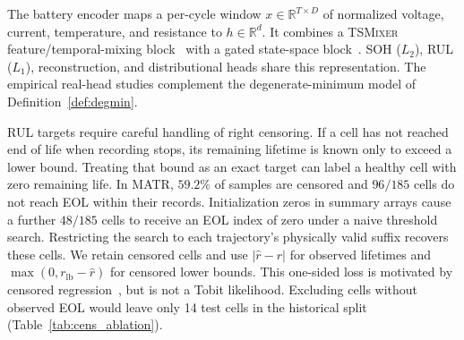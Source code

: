 \documentclass{article}
\begin{document}
\begin{table}[t]
\centering
\caption{Controlled high-dose collapse and task-recovery rates for three domains. Recovery is the fraction of seeds whose primary metric improves over the mean joint-training metric. HAR can retain high accuracy despite substantial shrinkage, so scatter recovery does not imply better accuracy. Battery uses 20 seeds per mode and RadioML ten; the historical HAR file provides aggregate rates. The joint recovery rate is set to zero by convention. All plotted rates are reproduced directly from the released records.}
\label{tab:unified_repair}
\footnotesize
{}
\end{table}

\clearpage
The battery encoder maps a per-cycle window $x\in\mathbb R^{T\times D}$ of normalized voltage, current, temperature, and resistance to $h\in\mathbb R^d$. It combines a \textsc{TSMixer} feature/temporal-mixing block~\citep{ekambaram2023tsmixer} with a gated state-space block~\citep{gu2022s4,gu2023mamba}. SOH ($L_2$), RUL ($L_1$), reconstruction, and distributional heads share this representation. The empirical real-head studies complement the degenerate-minimum model of Definition~\ref{def:degmin}.

RUL targets require careful handling of right censoring. If a cell has not reached end of life when recording stops, its remaining lifetime is known only to exceed a lower bound. Treating that bound as an exact target can label a healthy cell with zero remaining life. In MATR, $59.2\%$ of samples are censored and $96/185$ cells do not reach EOL within their records. Initialization zeros in summary arrays cause a further $48/185$ cells to receive an EOL index of zero under a naive threshold search. Restricting the search to each trajectory's physically valid suffix recovers these cells. We retain censored cells and use $|\hat r-r|$ for observed lifetimes and $\max(0,r_{\mathrm{lb}}-\hat r)$ for censored lower bounds. This one-sided loss is motivated by censored regression~\citep{tobin1958estimation}, but is not a Tobit likelihood. Excluding cells without observed EOL would leave only 14 test cells in the historical split (Table~\ref{tab:cens_ablation}).
\end{document}
